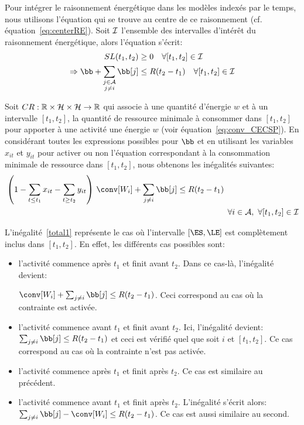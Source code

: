 Pour intégrer le raisonnement énergétique dans les modèles indexés par
le temps, nous utilisons l'équation qui se trouve au centre de ce
raisonnement (cf. équation~\eqref{eq:centerRE}). Soit ${\cal I}$ l'ensemble des
intervalles d'intérêt du raisonnement énergétique, alors l'équation
s'écrit:  
\begin{align} 
  SL(t_1,t_2) &\ge 0 \quad \forall [t_1,t_2] \in \I \nonumber\\
  \Rightarrow \bb + \sum_{\substack{j\in \A\\j\neq i}}\bb[j] &\le
  R(t_2-t_1)\quad \forall [t_1,t_2] \in \I \nonumber
\end{align}  

Soit $CR: \mathbb{R} \times {\cal H} \times {\cal H} \rightarrow \mathbb{R}$ qui
associe à une quantité d'énergie $w$ et à un intervalle $[t_1,t_2]$,
la quantité de ressource minimale à consommer dans $[t_1,t_2]$ pour
apporter à une activité une énergie $w$ (voir
équation~\eqref{eq:conv_CECSP}). En considérant toutes les
expressions possibles pour $\bb$ et en utilisant les variables
$x_{it}$ et $y_{it}$ pour activer ou non l'équation correspondant à la
consommation minimale de ressource dans $[t_1,t_2]$, nous obtenons les
inégalités suivantes: 
\begin{align}
  &\left(1-\sum_{t\le t_1}x_{it} - \sum_{t\ge t_2}y_{it}\right) \, \conv[W_i] +
    \sum_{j\neq i} \bb[j] \le R(t_2-t_1) \nonumber\\
  & \hspace{9.55cm} \forall i \in \A,\ \forall [t_1,t_2] \in \I
    \label{total1}
\end{align}

L'inégalité~\eqref{total1} représente le cas où l'intervalle
$[\ES,\LE]$ est complètement inclus dans $[t_1,t_2]$. En effet,
les différents cas possibles sont: 
\begin{itemize}
\item l'activité commence après $t_1$ et finit avant $t_2$. Dans ce
  cas-là, l'inégalité devient: 

$\conv[W_i] +\sum_{j\neq i} \bb[j] \le
  R(t_2-t_1)$. Ceci correspond au cas où la contrainte est activée. 
\item l'activité commence avant $t_1$ et finit avant $t_2$. Ici,
  l'inégalité devient: $\sum_{j\neq i} \bb[j] \le R(t_2-t_1)$ et ceci
  est vérifié quel que soit $i$ et $[t_1,t_2]$. Ce cas correspond au
  cas où la contrainte n'est pas activée. 
\item l'activité commence après $t_1$ et finit après $t_2$. Ce cas est
  similaire au précédent. 
\item l'activité commence avant $t_1$ et finit après
  $t_2$. L'inégalité s'écrit alors: $\sum_{j\neq i} \bb[j]-\conv[W_i]
  \le R(t_2-t_1)$. Ce cas est aussi similaire au second. 
\end{itemize}

